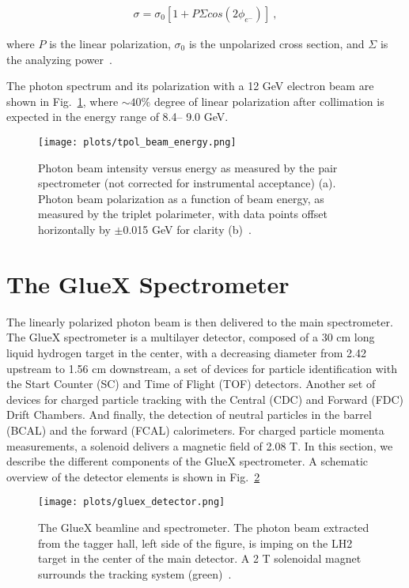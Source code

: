 \begin{equation}
    \label{eq.2.1.3}
    \begin{aligned}
        \sigma = \sigma_0[1+P\Sigma cos(2\phi_{e^-})]~,
    \end{aligned}
\end{equation}

\noindent where $P$ is the linear polarization, $\sigma_0$ is the unpolarized cross section, and $\Sigma$ is the analyzing power~\cite{32}.
~\par The photon spectrum and its polarization with a 12 GeV electron beam are shown in Fig.~\ref{fig.2.1.3}, where $\sim 40\%$ degree of linear polarization after collimation is expected in the energy range of 8.4– 9.0 GeV.

\begin{figure}[H]
    \centering
        \texttt{[image: plots/tpol\_beam\_energy.png]}
        \caption{Photon beam intensity versus energy as measured by the pair spectrometer (not corrected for instrumental acceptance) (a). Photon beam polarization as a function of beam energy, as measured by the triplet polarimeter, with data points offset horizontally by $\pm$0.015 GeV for clarity (b)~\cite{31}.}
        \label{fig.2.1.3}
\end{figure}


\section{The GlueX Spectrometer}
\label{p.2.2}

The linearly polarized photon beam is then delivered to the main spectrometer. The GlueX spectrometer is a multilayer detector, composed of a 30 cm long liquid hydrogen target in the center, with a decreasing diameter from 2.42 upstream to 1.56 cm downstream, a set of devices for particle identification with the Start Counter (SC) and Time of Flight (TOF) detectors. Another set of devices for charged particle tracking with the Central (CDC) and Forward (FDC) Drift Chambers. And finally, the detection of neutral particles in the barrel (BCAL) and the forward (FCAL) calorimeters. For charged particle momenta measurements, a solenoid delivers a magnetic field of 2.08 T. In this section, we describe the different components of the GlueX spectrometer. A schematic overview of the detector elements is shown in Fig.~\ref{fig.2.2.1}

\begin{figure}[H]
    \centering
        \texttt{[image: plots/gluex\_detector.png]}
        \caption{The GlueX beamline and spectrometer. The photon beam extracted from the tagger hall, left side of the figure, is imping on the LH2 target in the center of the main detector. A 2 T solenoidal magnet surrounds the tracking system (green)~\cite{31}.}
        \label{fig.2.2.1}
\end{figure}

